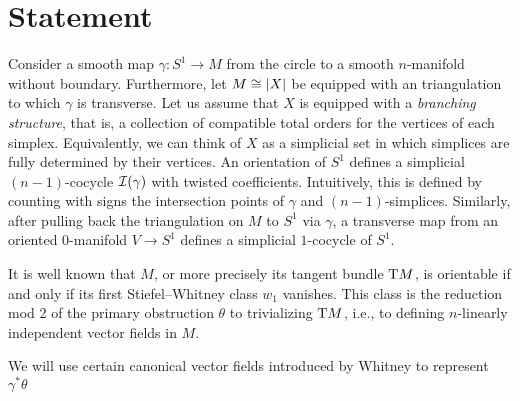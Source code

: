 
\section{Statement}

Consider a smooth map $\gamma \colon S^1 \to M$ from the circle to a smooth $n$-manifold without boundary.
Furthermore, let $M \cong \lvert X\rvert$ be equipped with an triangulation to which $\gamma$ is transverse.
Let us assume that $X$ is equipped with a \textit{branching structure}, that is, a collection of compatible total orders for the vertices of each simplex.
Equivalently, we can think of $X$ as a simplicial set in which simplices are fully determined by their vertices.
An orientation of $S^1$ defines a simplicial $(n-1)$-cocycle $\mathcal{I}(\gamma)$ with twisted coefficients.
Intuitively, this is defined by counting with signs the intersection points of $\gamma$ and $(n-1)$-simplices.
Similarly, after pulling back the triangulation on $M$ to $S^1$ via $\gamma$, a transverse map from an oriented $0$-manifold $V \to S^1$ defines a simplicial $1$-cocycle of $S^1$.


It is well known that $M$, or more precisely its tangent bundle $\mathrm{T} M$, is orientable if and only if its first Stiefel--Whitney class $w_1$ vanishes.
This class is the reduction mod 2 of the primary obstruction $\theta$ to trivializing $\mathrm{T} M$, i.e., to defining $n$-linearly independent vector fields in $M$.

We will use certain canonical vector fields introduced by Whitney to represent $\gamma^\ast \theta$


